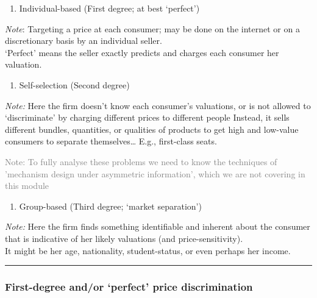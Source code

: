 \documentclass[]{article}
\providecommand{\tightlist}{%
  \setlength{\itemsep}{0pt}\setlength{\parskip}{0pt}}
\begin{document}
\begin{enumerate}
\def\labelenumi{\arabic{enumi}.}
\tightlist
\item
  Individual-based (First degree; at best `perfect')
\end{enumerate}

\emph{Note}: Targeting a price at each consumer; may be done on the internet or on a discretionary basis by an individual seller.\\
`Perfect' means the seller exactly predicts and charges each consumer her valuation.

\bigskip

\begin{enumerate}
\def\labelenumi{\arabic{enumi}.}
\setcounter{enumi}{1}
\tightlist
\item
  Self-selection (Second degree)
\end{enumerate}

\emph{Note:}
Here the firm doesn't know each consumer's valuations, or is not allowed to `discriminate' by charging different prices to different people
Instead, it sells different bundles, quantities,
or qualities of products to get high and low-value consumers to separate themselves\ldots{}
E.g., first-class seats.

\bigskip

\textcolor{gray}{Note: To fully analyse these problems we need to know the techniques of 'mechanism design under asymmetric information', which we are not covering in this module}

\bigskip

\begin{enumerate}
\def\labelenumi{\arabic{enumi}.}
\setcounter{enumi}{2}
\tightlist
\item
  Group-based (Third degree; `market separation')
\end{enumerate}

\emph{Note:}
Here the firm finds something identifiable and inherent about the consumer\\
that is indicative of her likely valuations (and price-sensitivity).\\
It might be her age, nationality, student-status, or even perhaps her income.

\begin{center}\rule{0.5\linewidth}{\linethickness}\end{center}

\hypertarget{first-degree-andor-perfect-price-discrimination}{%
\subsubsection{First-degree and/or `perfect' price discrimination}\label{first-degree-andor-perfect-price-discrimination}}
\end{document}
